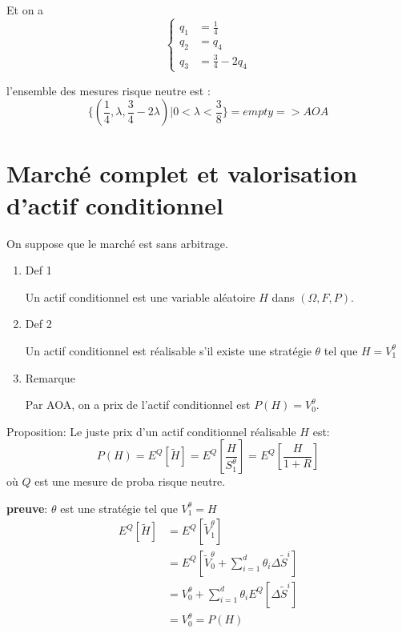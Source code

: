 \documentclass{article}
\begin{document}
Et on a
\begin{equation}
\left\{ \begin{array}{rcl}
q_1&=\frac{1}{4} \\
q_2&=q_4 \\ 
q_3&=\frac{3}{4}-2q_4
\end{array}\right.
\end{equation}

l'ensemble des mesures risque neutre est :
\begin{equation}
\{(\frac{1}{4},\lambda,\frac{3}{4}-2\lambda)|0<\lambda<\frac{3}{8}\}=empty => AOA
\end{equation}

\section{March\'e complet et valorisation d'actif conditionnel}

On suppose que le march\'e est sans arbitrage.

\begin{enumerate}
	\item Def 1
	
Un actif conditionnel est une variable al\'eatoire $H$ dans $(\Omega, F, P)$.
	
	\item Def 2
	
	Un actif conditionnel est r\'ealisable s'il existe une strat\'egie $\theta$ tel que $H=V_1^\theta$
	
	\item Remarque
	
	Par AOA, on a prix de l'actif conditionnel est $P(H)=V_0^\theta$.
\end{enumerate}

Proposition: Le juste prix d'un actif conditionnel r\'ealisable $H$ est:
\begin{equation}
P(H) = E^Q[\tilde{H}]=E^Q[\frac{H}{S_1^\theta}]=E^Q[\frac{H}{1+R}]
\end{equation}
o\`u $Q$ est une mesure de proba risque neutre.

\textbf{preuve}: 
$\theta$ est une strat\'egie tel que $V_1^\theta=H$
\begin{equation}
\begin{split}
E^Q[\tilde{H}]&=E^Q[\tilde{V}_1^\theta]\\
&=E^Q[\tilde{V}_0^\theta+\sum_{i=1}^d \theta_i \Delta \tilde{S}^i]\\
&=V_0^\theta+\sum_{i=1}^d \theta_i E^Q[\Delta \tilde{S}^i]\\
&=V_0^\theta=P(H)
\end{split}
\end{equation}
\end{document}

